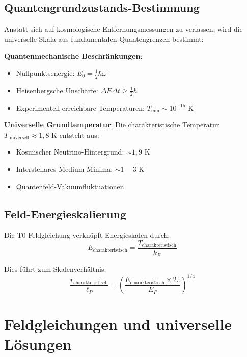 \documentclass[12pt,a4paper]{article}
\begin{document}
	\subsection{Quantengrundzustands-Bestimmung}
	\label{subsec:quantum_ground}
	
	Anstatt sich auf kosmologische Entfernungsmessungen zu verlassen, wird die universelle Skala aus fundamentalen Quantengrenzen bestimmt:
	
	\textbf{Quantenmechanische Beschr\"ankungen}:
	\begin{itemize}
		\item Nullpunktsenergie: $E_0 = \frac{1}{2}\hbar\omega$
		\item Heisenbergsche Unsch\"arfe: $\Delta E \Delta t \geq \frac{1}{2}\hbar$
		\item Experimentell erreichbare Temperaturen: $T_{\min} \sim 10^{-15}$ K
	\end{itemize}
	
	\textbf{Universelle Grundtemperatur}:
	Die charakteristische Temperatur $T_{\text{universell}} \approx 1{,}8$ K entsteht aus:
	\begin{itemize}
		\item Kosmischer Neutrino-Hintergrund: $\sim 1{,}9$ K
		\item Interstellares Medium-Minima: $\sim 1{-}3$ K
		\item Quantenfeld-Vakuumfluktuationen
	\end{itemize}
	
	\subsection{Feld-Energieskalierung}
	\label{subsec:field_scaling}
	
	Die T0-Feldgleichung verkn\"upft Energieskalen durch:
	\begin{equation}
		E_{\text{charakteristisch}} = \frac{T_{\text{charakteristisch}}}{k_B}
	\end{equation}
	
	Dies f\"uhrt zum Skalenverh\"altnis:
	\begin{equation}
		\frac{r_{\text{charakteristisch}}}{\ell_P} = \left(\frac{E_{\text{charakteristisch}} \times 2\pi}{E_P}\right)^{1/4}
	\end{equation}
	
	\section{Feldgleichungen und universelle L\"osungen}
	\label{sec:field_equations}
	
\end{document}
